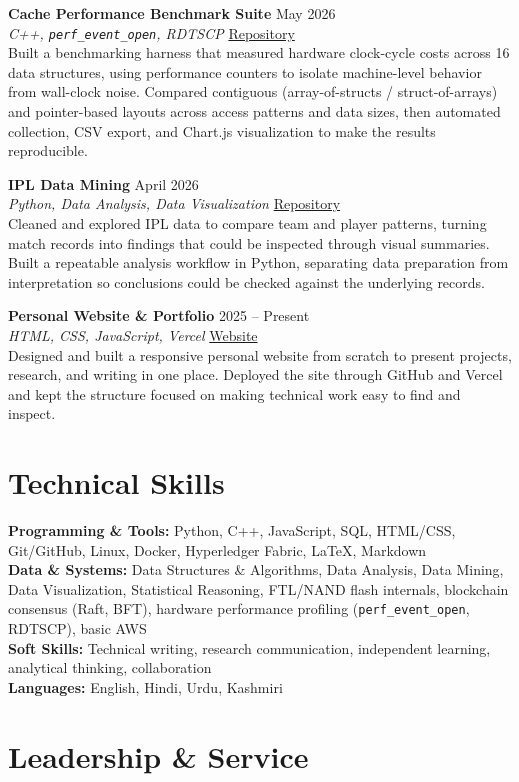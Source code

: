 \documentclass[10pt,a4paper]{article}
\newcommand{\project}[4]{
    \textbf{#1} \hfill #2\\
    \textit{#3} \hfill #4\\[0.1em]
}
\begin{document}
\project{Cache Performance Benchmark Suite}{May 2026}{C++, \texttt{perf\_event\_open}, RDTSCP}{\href{https://github.com/notmohsin/Performance-and-Data-Representation}{Repository}}
Built a benchmarking harness that measured hardware clock-cycle costs across 16 data structures, using performance counters to isolate machine-level behavior from wall-clock noise. Compared contiguous (array-of-structs / struct-of-arrays) and pointer-based layouts across access patterns and data sizes, then automated collection, CSV export, and Chart.js visualization to make the results reproducible.

\project{IPL Data Mining}{April 2026}{Python, Data Analysis, Data Visualization}{\href{https://github.com/notmohsin/IPL---Data-Mining}{Repository}}
Cleaned and explored IPL data to compare team and player patterns, turning match records into findings that could be inspected through visual summaries. Built a repeatable analysis workflow in Python, separating data preparation from interpretation so conclusions could be checked against the underlying records.

\project{Personal Website \& Portfolio}{2025 -- Present}{HTML, CSS, JavaScript, Vercel}{\href{https://sheikhmohsin.vercel.app/}{Website}}
Designed and built a responsive personal website from scratch to present projects, research, and writing in one place. Deployed the site through GitHub and Vercel and kept the structure focused on making technical work easy to find and inspect.

\section*{Technical Skills}

\textbf{Programming \& Tools:} Python, C++, JavaScript, SQL, HTML/CSS, Git/GitHub, Linux, Docker, Hyperledger Fabric, LaTeX, Markdown\\
\textbf{Data \& Systems:} Data Structures \& Algorithms, Data Analysis, Data Mining, Data Visualization, Statistical Reasoning, FTL/NAND flash internals, blockchain consensus (Raft, BFT), hardware performance profiling (\texttt{perf\_event\_open}, RDTSCP), basic AWS\\
\textbf{Soft Skills:} Technical writing, research communication, independent learning, analytical thinking, collaboration\\
\textbf{Languages:} English, Hindi, Urdu, Kashmiri

\section*{Leadership \& Service}
\end{document}
